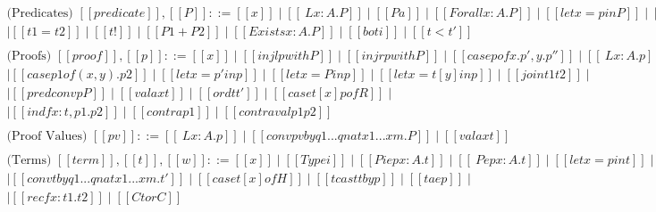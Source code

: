 \begin{center}
\begin{math}
\begin{array}{llllllllllllllll}
      \\
      \text{(Predicates) } [[predicate]], [[P]] ::= [[x]] \mid [[\ L x : A . P]] \mid [[P a]] \mid [[Forall x : A . P]] \mid [[let x = p in P]] \mid [[let x = P in P']] \mid \\
      [[let x = t [ p ] in P]] \mid [[t1 = t2]] \mid [[t !]] \mid [[P1 + P2]] \mid [[Exists x : A . P]] \mid [[bot i]] \mid [[t < t']] \\
      \\
      \text{(Proofs) } [[proof]],[[p]] ::= [[x]] \mid [[injl p with P]] \mid [[injr p with P]] \mid [[case p of x . p' , y . p'']] \mid [[\ L x : A . p]] \mid [[p a]] \mid \\
      [[(a , p ) as P]] \mid [[case p1 of ( x , y ) . p2]] \mid [[let x = p' in p]] \mid [[let x = P in p]] \mid [[let x = t [ y ] in p]] \mid [[join t1 t2]] \mid \\ 
      [[conv p by q1 ... qn at x1 ... xm . P]] \mid [[predconv p P]] \mid [[valax t]] \mid [[ord t t']] \mid [[case t [ x ] p of R]] \mid\\
      [[tcase t [ x ] of abort -> p1 | ! -> p2]] \mid [[ind f x : t , p1 . p2]] \mid [[contra p1]] \mid [[contraval p1 p2]]\\
      \\
      \text{(Proof Values) } [[pv]] ::= [[\ L x : A . p]] \mid [[conv pv by q1 ... qn at x1 ... xm . P]] \mid [[valax t]]\\
      \\
      \text{(Terms) } [[term]],[[t]],[[w]] ::= [[x]] \mid [[Type i]] \mid [[Pi ep x : A . t]] \mid [[\ P ep x : A . t]] \mid [[let x = p in t]] \mid [[let x = P in t]] \mid \\
      [[let x = t [ y ] in t']] \mid [[conv t by q1 ... qn at x1 ... xm . t']] \mid [[case t [ x ] of H]] \mid [[tcast t by p]] \mid [[t a ep]] \mid \\
      [[abort t]] \mid [[rec f x : t1 . t2]] \mid [[Ctor C]]\\      
    \end{array}
  \end{math}
\end{center}
